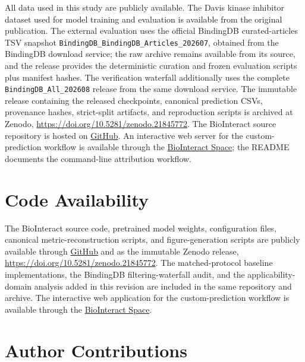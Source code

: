 \documentclass[fleqn,10pt]{wlscirep}
\begin{document}
All data used in this study are publicly available. The Davis kinase inhibitor
dataset used for model training and evaluation is available from the original
publication.\cite{davis2011comprehensive} The external evaluation uses the official
BindingDB curated-articles TSV snapshot
\texttt{BindingDB\_BindingDB\_Articles\_202607}, obtained from the BindingDB
download service;\cite{gilson2016bindingdb} the raw archive remains available from
its source, and the release provides the deterministic curation and frozen
evaluation scripts plus manifest hashes.
The verification waterfall additionally uses the complete
\texttt{BindingDB\_All\_202608} release from the same download service.
The immutable release containing the
released checkpoints, canonical prediction CSVs, provenance hashes, strict-split
artifacts, and reproduction scripts is archived at Zenodo,
\url{https://doi.org/10.5281/zenodo.21845772}. The BioInteract source repository
is hosted on \href{https://github.com/Liubo-520/bio-intelligence}{GitHub}. An interactive web
server for the custom-prediction workflow is available through the
\href{https://huggingface.co/spaces/AI4deeperScience/BioInteract}{BioInteract Space}; the README
documents the command-line attribution workflow.

\section*{Code Availability}

The BioInteract source code, pretrained model weights, configuration files,
canonical metric-reconstruction scripts, and figure-generation scripts are
publicly available through \href{https://github.com/Liubo-520/bio-intelligence}{GitHub} and
as the immutable Zenodo release, \url{https://doi.org/10.5281/zenodo.21845772}.
The matched-protocol baseline implementations, the BindingDB filtering-waterfall
audit, and the applicability-domain analysis added in this revision are included
in the same repository and archive.
The interactive web
application for the custom-prediction workflow is available through the
\href{https://huggingface.co/spaces/AI4deeperScience/BioInteract}{BioInteract Space}.

\section*{Author Contributions}
\end{document}
